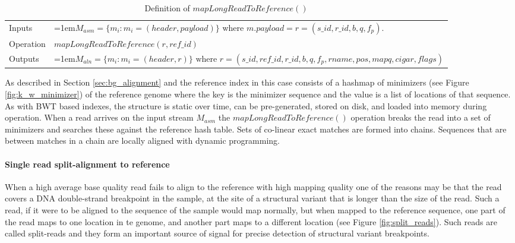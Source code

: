 \bgroup
\def\arraystretch{1.5}
\begin{table}[!ht]
    \caption{Definition of $mapLongReadToReference()$}
    \label{tab:op_map_long_read_to_reference}
    {\begin{tabular}{l|p{12cm}}
    \toprule
    Inputs & \hangindent=1em$M_{asm} = \{m_i: m_i = (header, payload)\}$ where $m.payload = r = (s\_id, r\_id, b, q, f_p)$. \\
    \cline{2-2}
    Operation & $mapLongReadToReference(r, ref\_id)$\\
    \cline{2-2}
    Outputs & \hangindent=1em$M_{aln} = \{m_i: m_i = (header, r)\} \text{ where } r = (s\_id, ref\_id, r\_id, b, q, f_p, rname, pos, mapq, cigar, flags)$\\
    \bottomrule
    \end{tabular}}
\end{table}
\egroup

As described in Section \ref{sec:bg_alignment} and \autocite{li2018minimap2} the reference index in this case consists of a hashmap of minimizers (see Figure \ref{fig:k_w_minimizer}) of the reference genome where the key is the minimizer sequence and the value is a list of locations of that sequence. As with BWT based indexes, the structure is static over time, can be pre-generated, stored on disk, and loaded into memory during operation. When a read arrives on the input stream $M_{asm}$ the $mapLongReadToReference()$ operation breaks the read into a set of minimizers and searches these against the reference hash table. Sets of co-linear exact matches are formed into chains. Sequences that are between matches in a chain are locally aligned with dynamic programming. 

\paragraph{Single read split-alignment to reference}
When a high average base quality read fails to align to the reference with high mapping quality one of the reasons may be that the read covers a DNA double-strand breakpoint in the sample, at the site of a structural variant that is longer than the size of the read. Such a read, if it were to be aligned to the sequence of the sample would map normally, but when mapped to the reference sequence, one part of the read maps to one location in te genome, and another part maps to a different location (see Figure \ref{fig:split_reads}). Such reads are called split-reads and they form an important source of signal for precise detection of structural variant breakpoints\autocites{rausch2012delly}{layer2014lumpy}.

